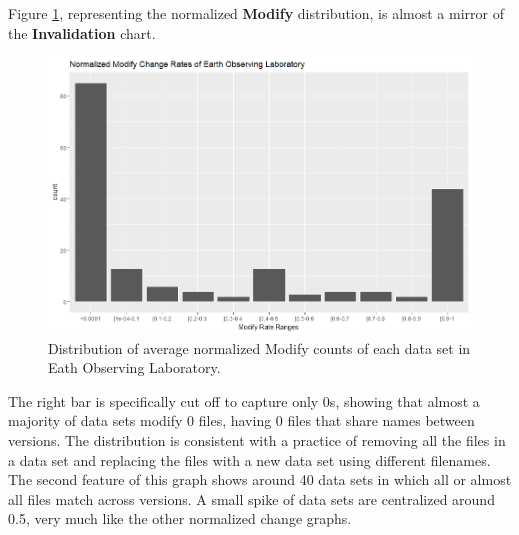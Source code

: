 Figure \ref{EOL_Mods}, representing the normalized \textbf{Modify} distribution, is almost a mirror of the \textbf{Invalidation} chart.
\begin{figure}%
	\centering
	\includegraphics[scale=.6]{figures/Eol_Mod.png}
	\caption{Distribution of average normalized Modify counts of each data set in Eath Observing Laboratory.}
	\label{EOL_Mods}
\end{figure}
The right bar is specifically cut off to capture only 0s, showing that almost a majority of data sets modify 0 files, having 0 files that share names between versions.
The distribution is consistent with a practice of removing all the files in a data set and replacing the files with a new data set using different filenames.
The second feature of this graph shows around 40 data sets in which all or almost all files match across versions.
A small spike of data sets are centralized around 0.5, very much like the other normalized change graphs.

